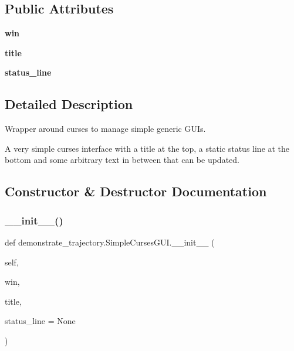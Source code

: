\subsection*{Public Attributes}
\begin{DoxyCompactItemize}
\item 
\mbox{\label{classdemonstrate__trajectory_1_1SimpleCursesGUI_ae25361dcf2c4119e655cf0b1cfaf1415}} 
{\bfseries win}
\item 
\mbox{\label{classdemonstrate__trajectory_1_1SimpleCursesGUI_a4e078b6f93564072c262880278db6291}} 
{\bfseries title}
\item 
\mbox{\label{classdemonstrate__trajectory_1_1SimpleCursesGUI_a1fd2de53b6b7aa388b127071707e4d57}} 
{\bfseries status\+\_\+line}
\end{DoxyCompactItemize}


\subsection{Detailed Description}
Wrapper around curses to manage simple generic G\+U\+Is. 

A very simple curses interface with a title at the top, a static status line at the bottom and some arbitrary text in between that can be updated. 

\subsection{Constructor \& Destructor Documentation}
\mbox{\label{classdemonstrate__trajectory_1_1SimpleCursesGUI_a75bb22b79a52c4aaaf98c5349b2d5992}} 
\subsubsection{\texorpdfstring{\+\_\+\+\_\+init\+\_\+\+\_\+()}{\_\_init\_\_()}}
{\footnotesize\ttfamily def demonstrate\+\_\+trajectory.\+Simple\+Curses\+G\+U\+I.\+\_\+\+\_\+init\+\_\+\+\_\+ (\begin{DoxyParamCaption}\item[{}]{self,  }\item[{}]{win,  }\item[{}]{title,  }\item[{}]{status\+\_\+line = {\ttfamily None} }\end{DoxyParamCaption})}



